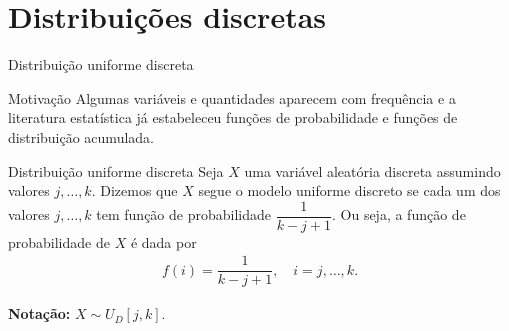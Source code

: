 \documentclass[9pt]{beamer}
\begin{document}
%


\section{Distribuições discretas}

\begin{frame}{Distribuição uniforme discreta}
\begin{block}{Motivação}
	Algumas variáveis e quantidades aparecem com frequência e a literatura estatística já estabeleceu funções de probabilidade e funções de distribuição acumulada.
\end{block}

\begin{block}{Distribuição uniforme discreta}
	Seja $X$ uma variável aleatória discreta assumindo valores $j, \dots, k$. Dizemos que $X$ segue o modelo uniforme discreto se cada um dos valores $j, \dots, k$ tem função de probabilidade $\dfrac{1}{k-j+1}$. Ou seja, a função de probabilidade de $X$ é dada por
	\begin{align*}
	f(i) = \dfrac{1}{k - j + 1}, \quad i=j, \dots, k.
	\end{align*}
\end{block}

\textbf{Notação:} $X \sim U_D[j,k]$.
\end{frame}
\end{document}
